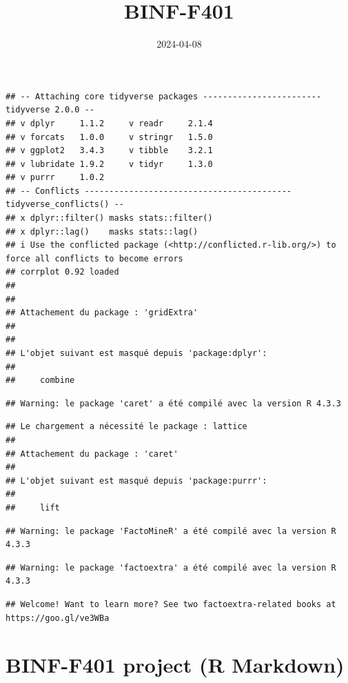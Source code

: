 \documentclass[
]{article}
\title{BINF-F401}
\author{}
\date{\vspace{-2.5em}2024-04-08}
\begin{document}
\maketitle

\begin{verbatim}
## -- Attaching core tidyverse packages ------------------------ tidyverse 2.0.0 --
## v dplyr     1.1.2     v readr     2.1.4
## v forcats   1.0.0     v stringr   1.5.0
## v ggplot2   3.4.3     v tibble    3.2.1
## v lubridate 1.9.2     v tidyr     1.3.0
## v purrr     1.0.2     
## -- Conflicts ------------------------------------------ tidyverse_conflicts() --
## x dplyr::filter() masks stats::filter()
## x dplyr::lag()    masks stats::lag()
## i Use the conflicted package (<http://conflicted.r-lib.org/>) to force all conflicts to become errors
## corrplot 0.92 loaded
## 
## 
## Attachement du package : 'gridExtra'
## 
## 
## L'objet suivant est masqué depuis 'package:dplyr':
## 
##     combine
\end{verbatim}

\begin{verbatim}
## Warning: le package 'caret' a été compilé avec la version R 4.3.3
\end{verbatim}

\begin{verbatim}
## Le chargement a nécessité le package : lattice
## 
## Attachement du package : 'caret'
## 
## L'objet suivant est masqué depuis 'package:purrr':
## 
##     lift
\end{verbatim}

\begin{verbatim}
## Warning: le package 'FactoMineR' a été compilé avec la version R 4.3.3
\end{verbatim}

\begin{verbatim}
## Warning: le package 'factoextra' a été compilé avec la version R 4.3.3
\end{verbatim}

\begin{verbatim}
## Welcome! Want to learn more? See two factoextra-related books at https://goo.gl/ve3WBa
\end{verbatim}

\hypertarget{binf-f401-project-r-markdown}{%
\section{BINF-F401 project (R
Markdown)}\label{binf-f401-project-r-markdown}}
\end{document}
